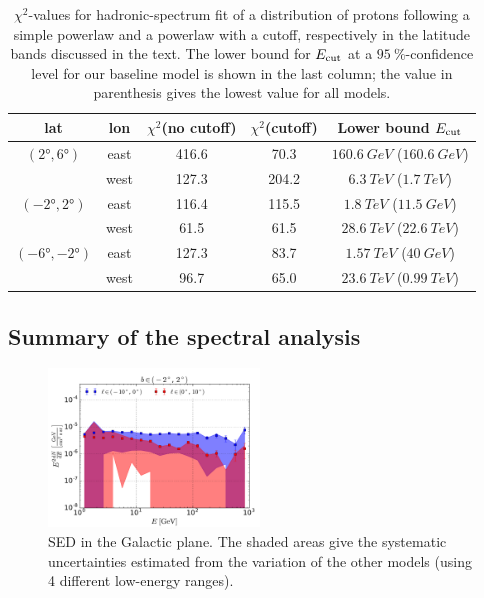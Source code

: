 \begin{table}
  \begin{center}
    \caption{$\chi^2$-values for hadronic-spectrum fit of a distribution of protons following a simple powerlaw and a powerlaw with a cutoff, respectively in the latitude bands discussed in the text. The lower bound for $E_{\text{cut}}$ at a $\SI{95}{\percent}$-confidence level for our baseline model is shown in the last column; the value in parenthesis gives the lowest value for all models.}
    \label{tab:IC}
    \begin{tabular}{|c|c|c|c|c|} %
     	\hline
		 lat & lon  & $\chi^2$(no cutoff) &  $\chi^2$(cutoff) & Lower bound $E_{\text{cut}}$ \\ 
		\hline
  		$(\ang{2}, \ang{6})$ & east & 416.6 & 70.3 & $\SI{160.6}{GeV}$ ($\SI{160.6}{GeV}$)\\ 
		& west &  127.3 & 204.2 & $\SI{6.3}{TeV}$ ($\SI{1.7}{TeV}$)\\ 
 		\hline
  		$(\ang{-2}, \ang{2})$ & east & 116.4 & 115.5 & $\SI{1.8}{TeV}$ ($\SI{11.5}{GeV}$)\\ 
		& west & 61.5 & 61.5 & $\SI{28.6}{TeV}$ ($\SI{22.6}{TeV}$)\\ 
 		\hline
  		$(\ang{-6}, \ang{-2})$ & east & 127.3 & 83.7 & $\SI{1.57}{TeV}$ ($\SI{40}{GeV}$)\\ 
		& west & 96.7 & 65.0 & $\SI{23.6}{TeV}$ ($\SI{0.99}{TeV}$)\\ 
 \hline
    \end{tabular}
  \end{center}
\end{table}


\subsection{Summary of the spectral analysis}

\begin{figure}[h]
 \includegraphics[width=0.5\textwidth]{plots/Summary_SED_0.pdf}
 \caption{SED in the Galactic plane. The shaded areas give the systematic uncertainties estimated from the variation of the other models (using 4 different low-energy ranges).}
 \label{fig:data_diff}
\end{figure}